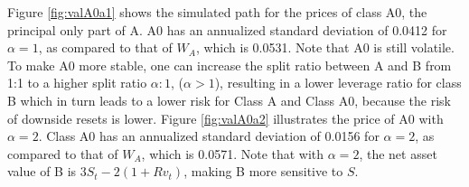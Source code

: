 \documentclass[11pt]{article}%
\numberwithin{equation}{section}
\theoremstyle{plain}
\begin{document}
\begin{appendices}
Figure \ref{fig:valA0a1} shows the simulated path for the prices of class A0, the principal only part of A. A0 has an annualized standard deviation of 0.0412 for $\alpha=1$, as compared to that of $W_A$, which is 0.0531. Note that A0 is still volatile. To make A0 more stable, one can increase the split ratio between A and B from 1:1 to a higher split ratio $\alpha:1$, ($\alpha >1$), resulting in a lower leverage ratio for class B which in turn leads to a lower risk for Class A and Class A0, because the risk of downside resets is lower. Figure \ref{fig:valA0a2} illustrates the price of A0 with $\alpha=2$. Class A0 has an annualized standard deviation of 0.0156 for $\alpha=2$, as compared to that of $W_A$, which is 0.0571. Note that with $\alpha = 2$, the net asset value of B is $3S_t-2(1+R v_t)$, making B more sensitive to $S$.









\end{appendices}
\end{document}
